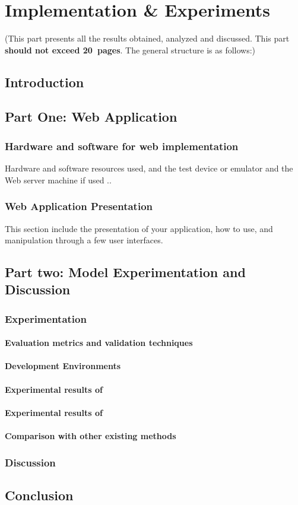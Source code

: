 \chapter{Implementation \& Experiments} \label{chap:implementation}

(This part presents all the results obtained, analyzed and discussed. This part \textbf{should not exceed 20~pages}. The general structure is as follows:)

\section*{Introduction}

\section{Part One: Web Application }
\subsection{Hardware and software for web implementation}
Hardware and software resources used, and the test device or emulator and the Web server machine if used .. \\

\subsection{Web Application Presentation}
This section include the presentation of your application, how to use, and manipulation through a few user interfaces.

\section{Part two: Model Experimentation and Discussion }
\subsection{Experimentation}

\subsubsection{Evaluation metrics and validation techniques}
\subsubsection{Development Environments}
\subsubsection{Experimental results of }
\subsubsection{Experimental results of }
\subsubsection{Comparison with other existing methods}
\subsection{Discussion}
\section*{Conclusion}